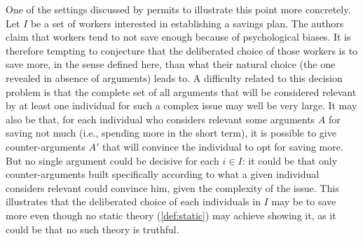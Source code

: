 \documentclass[version=last, pagesize, twoside=off, bibliography=totoc, DIV=calc, fontsize=12pt, a4paper, french, english]{scrartcl}
\begin{document}
One of the settings discussed by \citet{thaler_nudge_2009} permits to illustrate this point more concretely.
Let $I$ be a set of workers interested in establishing a savings plan. 
The authors claim that workers tend to not save enough because of psychological biases. 
It is therefore tempting to conjecture that the deliberated choice of those workers is to save more, in the sense defined here, than what their natural choice (the one revealed in absence of arguments) leads to.
A difficulty related to this decision problem is that the complete set of all arguments that will be considered relevant by at least one individual for such a complex issue may well be very large. It may also be that, for each individual who considers relevant some arguments $A$ for saving not much (i.e., spending more in the short term), it is possible to give counter-arguments $A'$ that will convince the individual to opt for saving more.
But no single argument could be decisive for each $i \in I$: it could be that only counter-arguments built specifically according to what a given individual considers relevant could convince him, given the complexity of the issue.
This illustrates that the deliberated choice of each individuals in $I$ may be to save more even though no static theory (\cref{def:static}) may achieve showing it, as it could be that no such theory is truthful.

\end{document}
